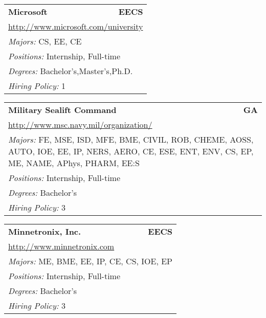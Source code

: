 \documentclass[twoside]{article}
\begin{document}
\begin{center}
\begin{multicols}{3}
\begin{FlushLeft}
\begin{minipage}{\columnwidth}
\end{minipage}
 
\begin{minipage}{\columnwidth}\begin{tabularx}{.95\columnwidth}{Xr}
                 {\Large\bf Microsoft} & {\Large\bf EECS}\\
    \multicolumn{2}{p{.95\columnwidth}}{\url{http://www.microsoft.com/university}}\\
    \multicolumn{2}{p{.95\columnwidth}}{\emph{Majors:} CS, EE, CE}\\
    \multicolumn{2}{p{.95\columnwidth}}{\emph{Positions:} Internship, Full-time}\\
    \multicolumn{2}{p{.95\columnwidth}}{\emph{Degrees:} Bachelor's,Master's,Ph.D.}\\
    \multicolumn{2}{p{.95\columnwidth}}{\emph{Hiring Policy:} 1}\\
    \end{tabularx}
    
\end{minipage}
 
\begin{minipage}{\columnwidth}\begin{tabularx}{.95\columnwidth}{Xr}
                 {\Large\bf Military Sealift Command} & {\Large\bf GA}\\
    \multicolumn{2}{p{.95\columnwidth}}{\url{http://www.msc.navy.mil/organization/}}\\
    \multicolumn{2}{p{.95\columnwidth}}{\emph{Majors:} FE, MSE, ISD, MFE, BME, CIVIL, ROB, CHEME, AOSS, AUTO, IOE, EE, IP, NERS, AERO, CE, ESE, ENT, ENV, CS, EP, ME, NAME, APhys, PHARM, EE:S}\\
    \multicolumn{2}{p{.95\columnwidth}}{\emph{Positions:} Internship, Full-time}\\
    \multicolumn{2}{p{.95\columnwidth}}{\emph{Degrees:} Bachelor's}\\
    \multicolumn{2}{p{.95\columnwidth}}{\emph{Hiring Policy:} 3}\\
    \end{tabularx}
    
\end{minipage}
 
\begin{minipage}{\columnwidth}\begin{tabularx}{.95\columnwidth}{Xr}
                 {\Large\bf Minnetronix, Inc.} & {\Large\bf EECS}\\
    \multicolumn{2}{p{.95\columnwidth}}{\url{http://www.minnetronix.com}}\\
    \multicolumn{2}{p{.95\columnwidth}}{\emph{Majors:} ME, BME, EE, IP, CE, CS, IOE, EP}\\
    \multicolumn{2}{p{.95\columnwidth}}{\emph{Positions:} Internship, Full-time}\\
    \multicolumn{2}{p{.95\columnwidth}}{\emph{Degrees:} Bachelor's}\\
    \multicolumn{2}{p{.95\columnwidth}}{\emph{Hiring Policy:} 3}\\
    \end{tabularx}
    

\end{minipage}
\end{FlushLeft}
\end{multicols}
\end{center}
\end{document}
